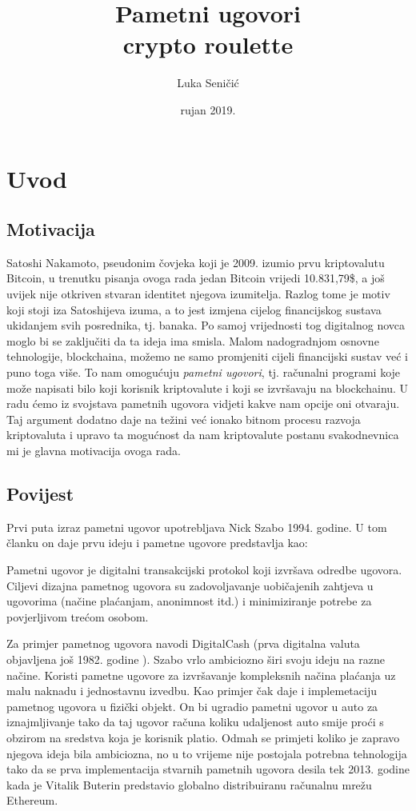 \documentclass[a4paper,oneside,12pt]{memoir} %
\title{Pametni ugovori \\ crypto roulette}
\author{Luka Seničić}
\date{rujan 2019.}  %
\begin{document}
\frontmatter


\chapter{Uvod}
\section{Motivacija}

Satoshi Nakamoto, pseudonim čovjeka koji je 2009. izumio prvu kriptovalutu Bitcoin, u trenutku pisanja ovoga rada jedan Bitcoin vrijedi 10.831,79\$, a još uvijek nije otkriven stvaran identitet njegova izumitelja. Razlog tome je motiv koji stoji iza Satoshijeva izuma, a to jest izmjena cijelog financijskog sustava ukidanjem svih posrednika, tj. banaka. Po samoj vrijednosti tog digitalnog novca moglo bi se zaključiti da ta ideja ima smisla. Malom nadogradnjom osnovne tehnologije, blockchaina, možemo ne samo promjeniti cijeli financijski sustav već i puno toga više. To nam omogućuju \emph{pametni ugovori}, tj. računalni programi koje može napisati bilo koji korisnik kriptovalute i koji se izvršavaju na blockchainu. U radu ćemo iz svojstava pametnih ugovora vidjeti kakve nam opcije oni otvaraju. Taj argument dodatno daje na težini već ionako bitnom procesu razvoja kriptovaluta i upravo ta mogućnost da nam kriptovalute postanu svakodnevnica mi je glavna motivacija ovoga rada. 

\section{Povijest}

Prvi puta izraz pametni ugovor upotrebljava Nick Szabo 1994. godine\cite{smart_contract_idea}. U tom članku on daje prvu ideju i pametne ugovore predstavlja kao:

\begin{definicija}
Pametni ugovor je digitalni transakcijski protokol koji izvršava odredbe ugovora. Ciljevi dizajna pametnog ugovora su zadovoljavanje uobičajenih zahtjeva u ugovorima (načine plaćanjam, anonimnost itd.) i minimiziranje potrebe za povjerljivom trećom osobom.
\end{definicija}

Za primjer pametnog ugovora navodi DigitalCash (prva digitalna valuta objavljena još 1982. godine \cite{digi_cash}). Szabo vrlo ambiciozno širi svoju ideju na razne načine. Koristi pametne ugovore za izvršavanje kompleksnih načina plaćanja uz malu naknadu i jednostavnu izvedbu. Kao primjer čak daje i implemetaciju pametnog ugovora u fizički objekt. On bi ugradio pametni ugovor u auto za iznajmljivanje tako da taj ugovor računa koliku udaljenost auto smije proći s obzirom na sredstva koja je korisnik platio. Odmah se primjeti koliko je zapravo njegova ideja bila ambiciozna, no u to vrijeme nije postojala potrebna tehnologija tako da se prva implementacija stvarnih pametnih ugovora desila tek 2013. godine kada je Vitalik Buterin predstavio globalno distribuiranu računalnu mrežu Ethereum.
\end{document}
